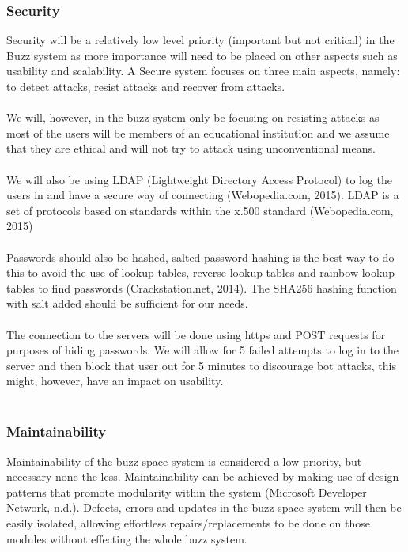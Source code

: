 \subsubsection{Security}
Security will be a relatively low level priority (important but not critical) in the Buzz system as more importance will need to be placed on other aspects such as usability and scalability. A Secure system focuses on three main aspects, namely: to detect attacks, resist attacks and recover from attacks.\\
\\
We will, however, in the buzz system only be focusing on resisting attacks as most of the users will be members of an educational institution and we assume that they are ethical and will not try to attack using unconventional means.\\
\\
We will also be using LDAP (Lightweight Directory Access Protocol) to log the users in and have a secure way of connecting (Webopedia.com, 2015). LDAP is a set of protocols based on standards within the x.500 standard (Webopedia.com, 2015)\\
\\
Passwords should also be hashed, salted password hashing is the best way to do this to avoid the use of lookup tables, reverse lookup tables and rainbow lookup tables to find passwords (Crackstation.net, 2014). The SHA256 hashing function with salt added should be sufficient for our needs.\\
\\
The connection to the servers will be done using https and POST requests for purposes of hiding passwords. We will allow for 5 failed attempts to log in to the server and then block that user out for 5 minutes to discourage bot attacks, this might, however, have an impact on usability.\\
\\
\subsubsection{Maintainability}
Maintainability of the buzz space system is considered a low priority, but necessary none the less. Maintainability can be achieved by making use of design patterns that promote modularity within the system (Microsoft Developer Network, n.d.). Defects, errors and updates in the buzz space system will then be easily isolated, allowing effortless repairs/replacements to be done on those modules without effecting the whole buzz system.\\


